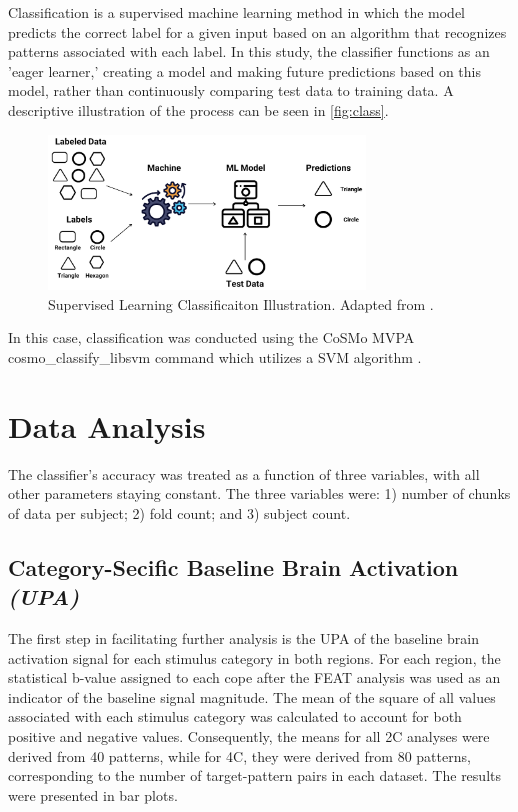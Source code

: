 Classification is a supervised machine learning method in which the model predicts the correct label for a given input based on an algorithm that recognizes patterns associated with each label. In this study, the classifier functions as an 'eager learner,' creating a model and making future predictions based on this model, rather than continuously comparing test data to training data. A descriptive illustration of the process can be seen in \autoref{fig:class}.

\begin{figure}[htbp]
    \centering
    \includegraphics[width = 0.75\textwidth]{assets/images/class.png}
    \caption[Illustration of Supervised Learning Classification]{Supervised Learning Classificaiton Illustration. Adapted from \cite{ML}.}
    \label{fig:class}
\end{figure}

In this case, classification was conducted using the CoSMo \gls{MVPA} cosmo\_classify\_libsvm command \cite{cosmo2} which utilizes a \gls{SVM}  algorithm \cite{Cortes1995}.

\section{Data Analysis}

The classifier's accuracy was treated as a function of three variables, with all other parameters staying constant. The three variables were: 1) number of chunks of data per subject; 2) fold count; and 3) subject count.

\subsection{Category-Secific Baseline Brain Activation \textit{(UPA)}}

The first step in facilitating further analysis is the \gls{UPA} of the baseline brain activation signal for each stimulus category in both regions. For each region, the statistical b-value assigned to each cope after the \acrshort{FEAT} analysis was used as an indicator of the baseline signal magnitude. The mean of the square of all values associated with each stimulus category was calculated to account for both positive and negative values. Consequently, the means for all \gls{2C} analyses were derived from 40 patterns, while for \gls{4C}, they were derived from 80 patterns, corresponding to the number of target-pattern pairs in each dataset. The results were presented in bar plots.

